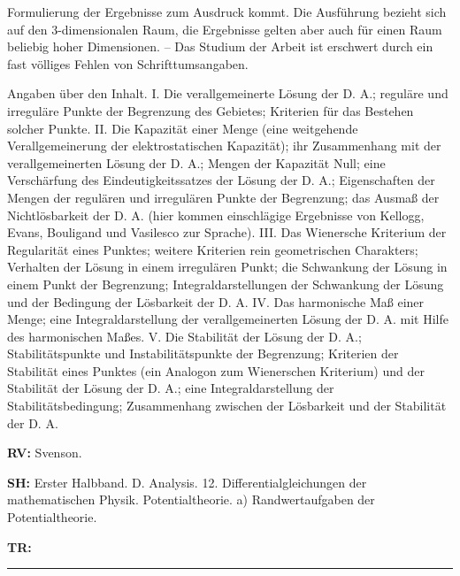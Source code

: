 {Formulierung der Ergebnisse
zum Ausdruck kommt. Die Ausf\"uhrung bezieht sich auf
den 3-dimensionalen
Raum, die Ergebnisse gelten aber auch f\"ur einen Raum beliebig
hoher Dimensionen. --
Das Studium der Arbeit ist erschwert durch ein fast v\"olliges
Fehlen von Schrifttumsangaben.
\par
 Angaben \"uber den Inhalt. I. Die verallgemeinerte L\"osung der D. A.;
regul\"are
und irregul\"are Punkte
der Begrenzung des Gebietes; Kriterien f\"ur das Bestehen
solcher
Punkte. II. Die Kapazit\"at einer Menge (eine weitgehende Verallgemeinerung der
elektrostatischen Kapazit\"at); ihr Zusammenhang mit der verallgemeinerten
L\"osung
der D. A.; Mengen der Kapazit\"at Null; eine Versch\"arfung des
Eindeutigkeitssatzes
der L\"osung der D.
A.; Eigenschaften der Mengen der regul\"aren und irregul\"aren
Punkte der Begrenzung;
das Ausma{\ss} der Nichtl\"osbarkeit der D. A. (hier kommen
einschl\"agige Ergebnisse
von Kellogg, Evans, Bouligand und Vasilesco zur Sprache).
III. Das Wienersche
Kriterium der Regularit\"at eines Punktes; weitere Kriterien rein
geometrischen Charakters; Verhalten der L\"osung in einem irregul\"aren Punkt; die
Schwankung der L\"osung
in einem Punkt der Begrenzung; Integraldarstellungen der
Schwankung der L\"osung und der Bedingung der L\"osbarkeit der D. A. IV. Das
harmonische Ma{\ss} einer Menge; eine Integraldarstellung der verallgemeinerten
L\"osung
der D. A. mit Hilfe
des harmonischen Ma{\ss}es. V. Die Stabilit\"at der L\"osung der D.
A.;
Stabilit\"atspunkte und Instabilit\"atspunkte der Begrenzung; Kriterien der
Stabilit\"at
eines Punktes (ein Analogon zum Wienerschen Kriterium) und der Stabilit\"at der
L\"osung der D. A.; eine Integraldarstellung der Stabilit\"atsbedingung;
Zusammenhang
zwischen der L\"osbarkeit und der Stabilit\"at der D. A.
}
\item{\bf RV:} Svenson.
\item{\bf SH:} Erster Halbband. D. Analysis. 12. Differentialgleichungen der mathematischen
Physik. Potentialtheorie.
a) Randwertaufgaben der Potentialtheorie.
\item{\bf TR:}

\bigskip\par\noindent\hrule\bigskip\par

